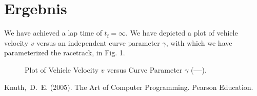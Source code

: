 \documentclass[pdf]{ifacconf}
\begin{document}
\section{Ergebnis}
We have achieved a lap time of $t_{\text{f}}=\infty$. We have depicted a plot of vehicle velocity $v$ versus an independent curve parameter $\gamma$, with which we have parameterized the racetrack, in Fig. 1. 

\begin{figure}[h] %
\begin{center}
\caption{Plot of Vehicle Velocity $v$ versus Curve Parameter $\gamma$ ({\bf\color{black}---}).}
\label{fig1}
\end{center}
\end{figure}



%

\begin{thebibliography}{3}

Knuth,~D.~E. (2005).
\newblock The Art of Computer Programming.
\newblock Pearson Education.

\end{thebibliography}

\end{document}
